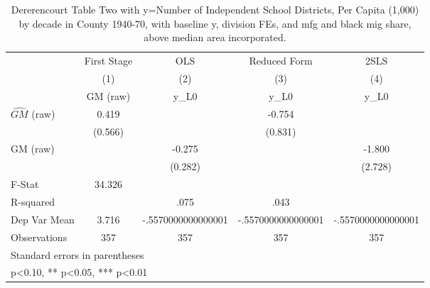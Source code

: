 \begin{table}[htbp]\centering
\def\sym#1{\ifmmode^{#1}\else\(^{#1}\)\fi}
\caption{Dererencourt Table Two with y=Number of Independent School Districts, Per Capita (1,000) by decade in County 1940-70, with baseline y, division FEs, and mfg and black mig share, above median area incorporated.}
\begin{tabular}{l*{4}{c}}
\toprule
                    & First Stage   &         OLS   &Reduced Form   &        2SLS   \\
                    &\multicolumn{1}{c}{(1)}&\multicolumn{1}{c}{(2)}&\multicolumn{1}{c}{(3)}&\multicolumn{1}{c}{(4)}\\
                    &\multicolumn{1}{c}{GM  (raw)}&\multicolumn{1}{c}{y\_L0}&\multicolumn{1}{c}{y\_L0}&\multicolumn{1}{c}{y\_L0}\\
\midrule
$\hat{GM}$ (raw)    &       0.419   &               &      -0.754   &               \\
                    &     (0.566)   &               &     (0.831)   &               \\
\addlinespace
GM  (raw)           &               &      -0.275   &               &      -1.800   \\
                    &               &     (0.282)   &               &     (2.728)   \\
\midrule
F-Stat              &      34.326   &               &               &               \\
R-squared           &               &        .075   &        .043   &               \\
Dep Var Mean        &       3.716   &-.5570000000000001   &-.5570000000000001   &-.5570000000000001   \\
Observations        &         357   &         357   &         357   &         357   \\
\bottomrule
\multicolumn{5}{l}{\footnotesize Standard errors in parentheses}\\
\multicolumn{5}{l}{\footnotesize * p<0.10, ** p<0.05, *** p<0.01}\\
\end{tabular}
\end{table}

